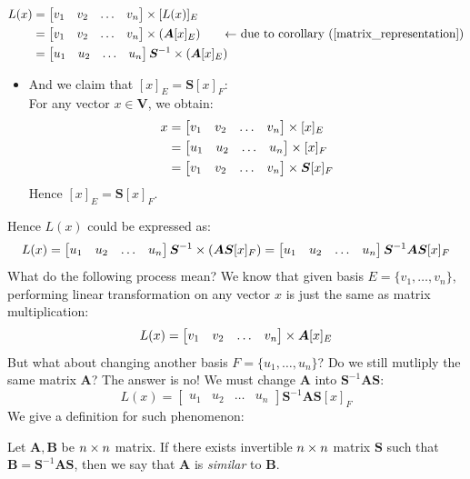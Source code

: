 \[
\begin{aligned}
L(x)  	&=	\begin{bmatrix}v_1&v_2&\dots&v_n\end{bmatrix}\times [L(x)]_{E}\\
	    	&= \begin{bmatrix}v_1&v_2&\dots&v_n\end{bmatrix}\times (\bm A[x]_{E})\qquad\text{$\leftarrow$ due to corollary (\ref{matrix_representation})}
	    	\\
	    	&= \begin{bmatrix}u_1&u_2&\dots&u_n\end{bmatrix}\bm S^{-1}\times (\bm A[x]_{E})\\
\end{aligned}
\]
\begin{itemize}
\item
And we claim that $[x]_{E}=\bm S[x]_{F}$:\\
For any vector $x\in\bm V$, we obtain:
\[
\begin{aligned}
x &=\begin{bmatrix}v_1&v_2&\dots&v_n\end{bmatrix}\times [x]_{E}\\
&=\begin{bmatrix}u_1&u_2&\dots&u_n\end{bmatrix}\times [x]_{F}\\
&= \begin{bmatrix}v_1&v_2&\dots&v_n\end{bmatrix}\times \bm S[x]_{F}
\end{aligned}
\]
Hence $[x]_{E}=\bm S[x]_{F}$.
\end{itemize}
Hence $L(x)$ could be expressed as:
\[
L(x)=
\begin{bmatrix}u_1&u_2&\dots&u_n\end{bmatrix}\bm S^{-1}\times (\bm A\bm S[x]_{F})=\begin{bmatrix}u_1&u_2&\dots&u_n\end{bmatrix}\bm S^{-1}\bm A\bm S[x]_{F}
\]
What do the following process mean? We know that given basis $E=\{v_1,\dots,v_n\}$, performing linear transformation on any vector $x$ is just the same as matrix multiplication:
\[
L(x)=\begin{bmatrix}v_1&v_2&\dots&v_n\end{bmatrix}\times \bm A[x]_{E}
\]
But what about changing another basis $F=\{u_1,\dots,u_n\}$? Do we still mutliply the same matrix $\bm A$? The answer is no! We must change $\bm A$ into $\bm S^{-1}\bm A\bm S$:
\[
L(x)=\begin{bmatrix}u_1&u_2&\dots&u_n\end{bmatrix}\bm S^{-1}\bm A\bm S[x]_{F}
\]
We give a definition for such phenomenon:
\begin{definition}[Similar]
Let $\bm A,\bm B$ be $n\times n$ matrix. If there exists invertible $n\times n$ matrix $\bm S$ such that $\bm B=\bm S^{-1}\bm A\bm S$, then we say that $\bm A$ is \emph{similar} to $\bm B$.
\end{definition}
